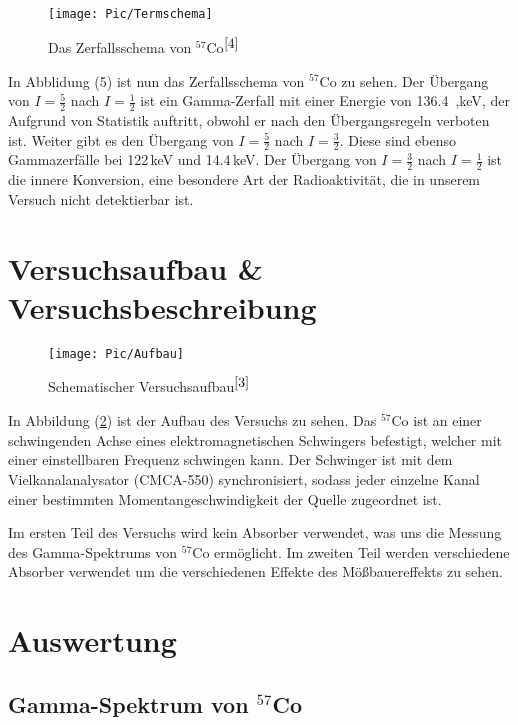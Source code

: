 \documentclass[10pt,twoside]{article}
\renewcommand{\1}{^{-1}}
\renewcommand{\2}{^{-2}}
\newcommand{\3}{^{-3}}
\newcommand{\4}{^{-4}}
\newcommand{\5}{^{-5}}
\newcommand{\6}{^{-6}}
\newcommand{\7}{^{-7}}
\newcommand{\8}{^{-8}}
\newcommand{\9}{^{-9}}
\begin{document}
\newpage

\begin{minipage}{0.5\textwidth}
\begin{figure}[H]
\texttt{[image: Pic/Termschema]} 
\label{Term}
\caption{Das Zerfallsschema von $^{57}$Co$^{\cite{4}}$}
\end{figure}
\end{minipage}
\begin{minipage}{0.5\textwidth}
In Abblidung (5) ist nun das Zerfallsschema von $^{57}$Co zu sehen. Der Übergang von $I=\frac{5}{2}$ nach $I=\frac{1}{2}$ ist ein Gamma-Zerfall mit einer Energie von 136.4~,keV, der Aufgrund von Statistik auftritt, obwohl er nach den Übergangsregeln verboten ist. Weiter gibt es den Übergang von $I=\frac{5}{2}$ nach $I=\frac{3}{2}$. Diese sind ebenso Gammazerfälle bei 122\,keV und 14.4\,keV. Der Übergang von $I=\frac{3}{2}$ nach $I=\frac{1}{2}$ ist die innere Konversion, eine besondere Art der Radioaktivität, die in unserem Versuch nicht detektierbar ist.
\end{minipage}


\section{Versuchsaufbau \& Versuchsbeschreibung}

\begin{figure}[H]
\centering
\texttt{[image: Pic/Aufbau]}
\caption{Schematischer Versuchsaufbau${^{\cite{3}}}$}
\label{Aufbau}
\end{figure}
In Abbildung (\ref{Aufbau}) ist der Aufbau des Versuchs zu sehen. Das $^{57}$Co ist an einer schwingenden Achse eines elektromagnetischen Schwingers befestigt, welcher mit einer einstellbaren Frequenz schwingen kann. Der Schwinger ist mit dem Vielkanalanalysator (CMCA-550) synchronisiert, sodass jeder einzelne Kanal einer bestimmten Momentangeschwindigkeit der Quelle zugeordnet ist. 

Im ersten Teil des Versuchs wird kein Absorber verwendet, was uns die Messung des Gamma-Spektrums von $^{57}$Co ermöglicht. Im zweiten Teil werden verschiedene Absorber verwendet um die verschiedenen Effekte des Mößbauereffekts zu sehen.

\newpage

\section{Auswertung}

\subsection{Gamma-Spektrum von $^{57}$Co}
\end{document}
